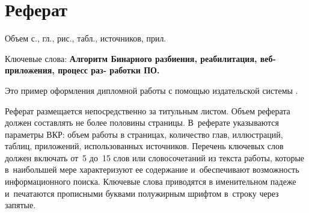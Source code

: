 \documentclass[a4paper,12pt]{diplom}
\begin{document}










\maketitle
\chapter{Реферат}

Объем  с.,  гл.,  рис.,
 табл.,  источников,  прил.

\medskip

Ключевые слова: \textbf{Алгоритм Бинарного разбиения, реабилитация, веб-приложения, процесс раз-
работки ПО.}

\medskip

Это пример оформления дипломной работы с помощью издательской системы \LaTeXe.

Реферат размещается непосредственно за титульным листом. Объем реферата должен составлять не более половины страницы. В~реферате указываются параметры ВКР: объем работы в страницах, количество глав, иллюстраций, таблиц, приложений, использованных источников. Перечень ключевых слов должен включать от~5 до~15 слов или словосочетаний из текста работы, которые в~наибольшей мере характеризуют ее содержание и~обеспечивают возможность информационного поиска. Ключевые слова приводятся в именительном падеже и~печатаются прописными буквами полужирным шрифтом в~строку через запятые.
\end{document}
